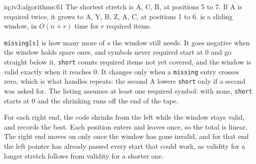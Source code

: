 \begin{solution}{iq:iv3:algorithms:61}
The shortest stretch is A, C, B, at positions 5 to 7. If A is required twice, it grows to A, Y, B, Z, A, C, at positions 1 to 6.  is a sliding window, in $O(n + r)$ time for $r$ required items.
\label{lst:iv3:al:minwindow}

\texttt{missing[s]} is how many more of $s$ the window still needs. It goes negative when the window holds spare ones, and symbols never required start at 0 and go straight below it. \texttt{short} counts required items not yet covered, and the window is valid exactly when it reaches 0. It changes only when a \texttt{missing} entry crosses zero, which is what handles repeats: the second A lowers \texttt{short} only if a second was asked for. The listing assumes at least one required symbol: with none, \texttt{short} starts at 0 and the shrinking runs off the end of the tape.

For each right end, the code shrinks from the left while the window stays valid, and records the best. Each position enters and leaves once, so the total is linear. The right end moves on only once the window has gone invalid, and for that end the left pointer has already passed every start that could work, as validity for a longer stretch follows from validity for a shorter one.

\end{solution}

